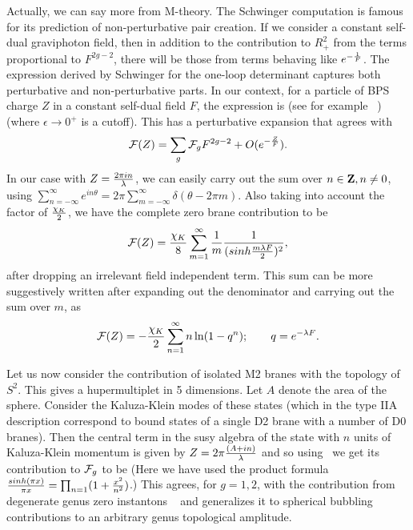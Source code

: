 Actually, we can say more from M-theory. The Schwinger computation is
famous for its prediction of non-perturbative pair creation. If we consider
a constant self-dual graviphoton field, then in addition to the
contribution to $R_+^2$ from the terms proportional to $F^{2g-2}$, there
will be those from terms behaving like $e^{-{1\over F}}$.
The expression derived by Schwinger for the one-loop determinant
captures both perturbative and non-perturbative parts. In our context, for a
particle of BPS charge $Z$ in a constant self-dual field $F$, the
expression is
(see for example \iz\ )
%
\eqn{}
%
(where $\epsilon \rightarrow 0^+$ is a cutoff).  This has a
perturbative expansion that agrees with \conh\
$${\cal F}(Z)=\sum_{g}{\cal F}_gF^{2g-2}+O(e^{-{Z\over F}}).$$
In our case with $Z={2\pi in\over \lambda}$, we can easily carry out the sum
over $n\in {\bf Z}, n\neq 0$, using $\sum_{n=-\infty}^{\infty}e^{in\theta}
=2\pi\sum_{m=-\infty}^{\infty}\delta(\theta-2\pi m)$. Also taking into
account the factor of ${\chi_K\over 2}$, we have the complete zero brane
contribution to be
$${\cal F}(Z)={\chi_K\over 8}\sum_{m=1}^{\infty}
{1\over m}{1\over (sinh{m\lambda F\over 2})^2},$$
after dropping an irrelevant field independent term.
This sum can be more suggestively written after expanding out the denominator
and carrying out the sum over $m$, as
$${\cal F}(Z)=-{\chi_K\over 2}\sum_{n=1}^{\infty}n\ln(1-q^n) ; \qquad q=e^{-\lambda
F}.$$


Let us now consider the contribution of isolated M2 branes with the
topology of $S^2$.  This gives a hupermultiplet in 5 dimensions.
Let $A$ denote the area of the sphere.  Consider
the Kaluza-Klein modes of these states (which in the type
IIA description correspond to bound states of a single D2 brane with a number
of D0 branes).  Then the central term in the susy algebra
of the state with $n$ units of Kaluza-Klein momentum is given by
$Z=2\pi{(A+ i n)\over \lambda}$ and so using \conh\ we get its contribution to
${\cal F}_g$ to be
%
\eqn{}
%
(Here we have used the product formula ${sinh(\pi x)\over \pi
x}=\prod_{n=1}(1+{x^2\over n^2})$.)
This agrees, for $g=1,2$, with the contribution from degenerate genus zero
instantons \bcovi\bcovii\ 
and generalizes it to spherical
bubbling contributions to an arbitrary genus topological amplitude.

